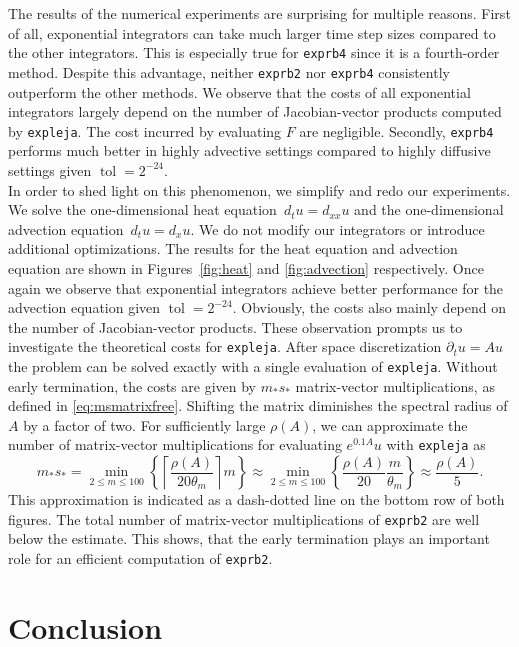 \documentclass{scrartcl}
\begin{document}
The results of the numerical experiments are surprising for multiple reasons. First of all, exponential integrators can take much larger time step sizes compared to the other integrators. This is especially true for \texttt{exprb4} since it is a fourth-order method. Despite this advantage, neither \texttt{exprb2} nor \texttt{exprb4} consistently outperform the other methods. We observe that the costs of all exponential integrators largely depend on the number of Jacobian-vector products computed by \texttt{expleja}. The cost incurred by evaluating $F$ are negligible. Secondly, \texttt{exprb4} performs much better in highly advective settings compared to highly diffusive settings given $\operatorname{tol} = 2^{-24}$. \\
In order to shed light on this phenomenon, we simplify and redo our experiments. We solve the one-dimensional heat equation~$d_tu=d_{xx}u$ and the one-dimensional advection equation~$d_tu=d_{x}u$. We do not modify our integrators or introduce additional optimizations. The results for the heat equation and advection equation are shown in Figures~\ref{fig:heat} and \ref{fig:advection} respectively. Once again we observe that exponential integrators achieve better performance for the advection equation given $\operatorname{tol} = 2^{-24}$. Obviously, the costs also mainly depend on the number of Jacobian-vector products. These observation prompts us to investigate the theoretical costs for \texttt{expleja}.
After space discretization $\partial_{t}u = Au$ the problem can be solved exactly with a single evaluation of \texttt{expleja}. Without early termination, the costs are given by $m_* s_*$ matrix-vector multiplications, as defined in \eqref{eq:msmatrixfree}. Shifting the matrix diminishes the spectral radius of $A$ by a factor of two. For sufficiently large $\rho (A)$, we can approximate the number of matrix-vector multiplications for evaluating $e^{0.1A}u$ with \texttt{expleja} as
\[
m_*s_* = \underset{2\le m\le 100}{\min}  \left\{{\left\lceil{\frac{\rho(A)}{20\theta_m}}\right\rceil}m\right\}
\approx
\underset{2\le m\le 100}{\min}  \left\{\frac{\rho(A)}{20}\frac{m}{\theta_m}\right\}
\approx \frac{\rho(A)}{5}.
\]
This approximation is indicated as a dash-dotted line on the bottom row of both figures. The total number of matrix-vector multiplications of \texttt{exprb2} are well below the estimate. This shows, that the early termination plays an important role for an efficient computation of \texttt{exprb2}.

\section{Conclusion}
\end{document}
